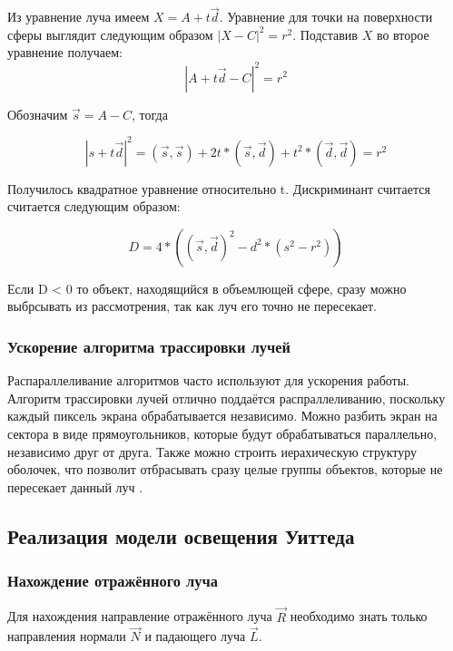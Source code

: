 Из уравнение луча имеем $X = A + t\vec{d}$. Уравнение для точки на поверхности сферы выглядит следующим образом $|X - C|^2 = r^2$. Подставив $X$ во второе уравнение получаем: 
\[
|A + t\vec{d} - C|^2 = r^2
\]

Обозначим $\vec{s} = A - C$, тогда

\[
|s + t\vec{d}|^2 = (\vec{s}, \vec{s}) + 2t*(\vec{s}, \vec{d}) + t^2*(\vec{d}, \vec{d}) = r^2
\]

Получилось квадратное уравнение относительно t. Дискриминант считается считается следующим образом:

\[
D = 4*((\vec{s}, \vec{d})^2 - d^2*(s^2 - r^2))    				
\]


Если D < 0 то объект, находящийся в объемлющей сфере, сразу можно выбрсывать из рассмотрения, так как луч его точно не пересекает.

\subsubsection{Ускорение алгоритма трассировки лучей}

Распараллеливание алгоритмов часто используют для ускорения работы. Алгоритм трассировки лучей отлично поддаётся распраллеливанию, поскольку каждый пиксель экрана обрабатывается независимо. Можно разбить экран на сектора в виде прямоугольников, которые будут обрабатываться параллельно, независимо друг от  друга. Также можно строить иерахическую структуру оболочек, что позволит отбрасывать сразу целые группы объектов, которые не пересекает данный луч \cite{trace}.

\subsection{Реализация модели освещения Уиттеда}

\subsubsection{Нахождение отражённого луча}

Для нахождения направление отражённого луча $\vec{R}$ необходимо знать только направления нормали $\vec{N}$ и падающего луча $\vec{L}$.

